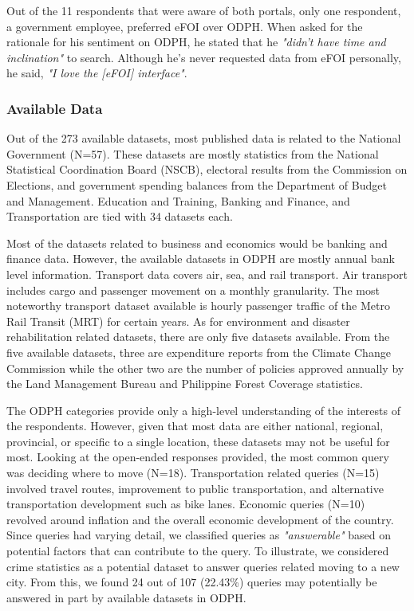 \documentclass{sigchi}
\begin{document}
Out of the 11 respondents that were aware of both portals, only one respondent, a government employee, preferred eFOI over ODPH. When asked for the rationale for his sentiment on ODPH, he stated that he \textit{"didn't have time and inclination"} to search. Although he's never requested data from eFOI personally, he said, \textit{"I love the [eFOI] interface"}. 

\subsubsection{Available Data}
Out of the 273 available datasets, most published data is related to the National Government (N=57). These datasets are mostly statistics from the National Statistical Coordination Board (NSCB), electoral results from the Commission on Elections, and government spending balances from the Department of Budget and Management. Education and Training, Banking and Finance, and Transportation are tied with 34 datasets each.

Most of the datasets related to business and economics would be banking and finance data. However, the available datasets in ODPH are mostly annual bank level information. Transport data covers air, sea, and rail transport. Air transport includes cargo and passenger movement on a monthly granularity. The most noteworthy transport dataset available is hourly passenger traffic of the Metro Rail Transit (MRT) for certain years. As for environment and disaster rehabilitation related datasets, there are only five datasets available. From the five available datasets, three are expenditure reports from the Climate Change Commission while the other two are the number of policies approved annually by the Land Management Bureau and Philippine Forest Coverage statistics.


The ODPH categories provide only a high-level understanding of the interests of the respondents. However, given that most data are either national, regional, provincial, or specific to a single location, these datasets may not be useful for most. Looking at the open-ended responses provided, the most common query was deciding where to move (N=18). Transportation related queries (N=15) involved travel routes, improvement to public transportation, and alternative transportation development such as bike lanes. Economic queries (N=10) revolved around inflation and the overall economic development of the country. Since queries had varying detail, we classified queries as \textit{"answerable"} based on potential factors that can contribute to the query. To illustrate, we considered crime statistics as a potential dataset to answer queries related moving to a new city. From this, we found 24 out of 107 (22.43\%) queries may potentially be answered in part by available datasets in ODPH. 
\end{document}
